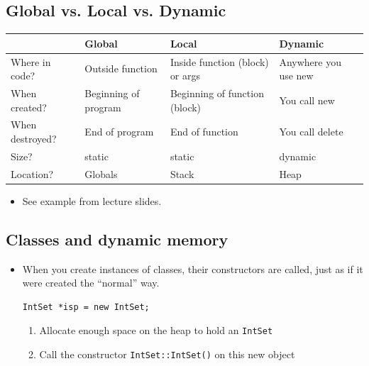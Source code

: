 \subsection{Global vs. Local vs. Dynamic}
\begin{center}
\begin{tabular}{l|l|l|l}
	& Global & Local & Dynamic \\
	\hline
	Where in code? & Outside function & Inside function (block) or args & Anywhere you use new \\
	When created? & Beginning of program & Beginning of function (block) & You call new \\
	When destroyed? & End of program & End of function & You call delete \\
	Size? & static & static & dynamic \\
	Location? & Globals & Stack & Heap \\
\end{tabular}
\end{center}
\begin{itemize}
	\item See example from lecture slides.
\end{itemize}

\subsection{Classes and dynamic memory}
\begin{itemize}
	\item When you create instances of classes, their constructors are called, just as if it were created the ``normal'' way.
\begin{lstlisting}[style=C++]
IntSet *isp = new IntSet;
\end{lstlisting}
	\begin{enumerate}
		\item Allocate enough space on the heap to hold an \lstinline[style=C++]{IntSet}
		\item Call the constructor \lstinline[style=C++]{IntSet::IntSet()} on this new object
	\end{enumerate}
\end{itemize}
